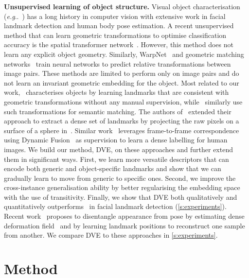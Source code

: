 \documentclass[10pt,twocolumn,letterpaper]{article}
\makeatletter
\DeclareRobustCommand\onedot{\futurelet\@let@token\@onedot}
\def\@onedot{\ifx\@let@token.\else.\null\fi\xspace}
\def\eg{\emph{e.g}\onedot} \def\Eg{\emph{E.g}\onedot}
\makeatother
\begin{document}
\noindent \textbf{Unsupervised learning of object structure.} Visual object characterisation (\eg~\cite{Cootes1995,Fergus2003,leibe2004combined,Dalal2005,Felzenszwalb2010}) has a long history in computer vision with extensive work in facial landmark detection and human body pose estimation.
A recent unsupervised method that can learn geometric transformations to optimise classification accuracy is the spatial transformer network~\cite{Jaderberg2015}.
However, this method does not learn any explicit object geometry.
Similarly, WarpNet~\cite{kanazawa16warpnet} and geometric matching networks~\cite{rocco17} train neural networks to predict relative transformations between image pairs.
These methods are limited to perform only on image pairs and do not learn an invariant geometric embedding for the object.
Most related to our work,~\cite{thewlis17unsupervised} characterises objects by learning landmarks that are consistent with geometric transformations without any manual supervision, while~\cite{novotny2018self} similarly use such transformations for semantic matching. 
The authors of~\cite{thewlis17unsupervised} extended their approach to extract a dense set of landmarks by projecting the raw pixels on a surface of a sphere in~\cite{thewlis17Bunsupervised}.
Similar work~\cite{schmidt2017self} leverages frame-to-frame correspondence using Dynamic Fusion~\cite{newcombe2015dynamicfusion} as supervision to learn a dense labelling for human images.
We build our method, DVE, on these approaches and further extend them in significant ways.
First, we learn more versatile descriptors that can encode both generic and object-specific landmarks and show that we can gradually learn to move from generic to specific ones.
Second, we improve the cross-instance generalisation ability by better regularising the embedding space with the use of transitivity.
Finally, we show that DVE both qualitatively and quantitatively outperforms~\cite{thewlis17unsupervised,thewlis17Bunsupervised} in facial landmark detection (\cref{s:experiments}).
Recent work~\cite{zhang2018unsupervised,jakab2018unsupervised,Wiles18a,shu2018deforming} proposes to disentangle appearance from pose by estimating dense deformation field~\cite{Wiles18a,shu2018deforming} and by learning landmark positions to reconstruct one sample from another.
We compare DVE to these approaches in \cref{s:experiments}.
 \section{Method}\label{s:method}
\end{document}
